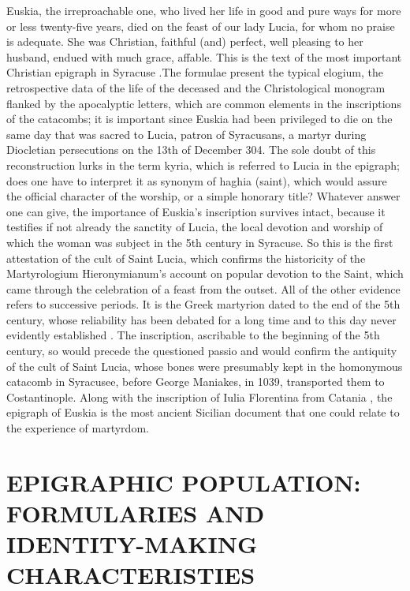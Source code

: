 \documentclass[amsthm,ebook]{saparticle}
\begin{document}
Euskia, the irreproachable one, who lived her life in good and pure ways for more or less twenty-five years, died on the feast of our lady Lucia, for whom no praise is adequate. She was Christian, faithful (and) perfect, well pleasing to her husband, endued with much grace, affable.
This is the text of the most important Christian epigraph in Syracuse \citep[20]{AGNELLO1953}.The formulae present the typical elogium, the retrospective data of the life of the deceased and the Christological monogram flanked by the apocalyptic letters, which are common elements in the inscriptions of the catacombs; it is important since Euskia had been privileged to die on the same day that was sacred to Lucia, patron of Syracusans, a martyr during Diocletian persecutions on the 13th of December 304. The sole doubt of this reconstruction lurks in the term kyria, which is referred to Lucia in the epigraph; does one have to interpret it as synonym of haghia (saint), which would assure the official character of the worship, or a simple honorary title? Whatever answer one can give, the importance of Euskia’s inscription survives intact, because it testifies if not already the sanctity of Lucia, the local devotion and worship of which the woman was subject in the 5th century in Syracuse.
So this is the first attestation of the cult of Saint Lucia, which confirms the historicity of the Martyrologium Hieronymianum’s account on popular devotion to the Saint, which came through the celebration of a feast from the outset. All of the other evidence refers to successive periods. It is the Greek martyrion dated to the end of the 5th century, whose reliability has been debated for a long time and to this day never evidently established \citep[95-135]{MILAZZORIZZONERVO1988}. The inscription, ascribable to the beginning of the 5th century, so would precede the questioned passio and would confirm the antiquity of the cult of Saint Lucia, whose bones were presumably kept in the homonymous catacomb in Syracusee, before George Maniakes, in 1039, transported them to Costantinople. Along with
the inscription of Iulia Florentina from Catania \citep[608-610]{RIZZA1964}, the epigraph of Euskia is the most ancient Sicilian document that one could relate to the experience of martyrdom.

\section{EPIGRAPHIC POPULATION: FORMULARIES AND IDENTITY-MAKING CHARACTERISTIES}
\end{document}
